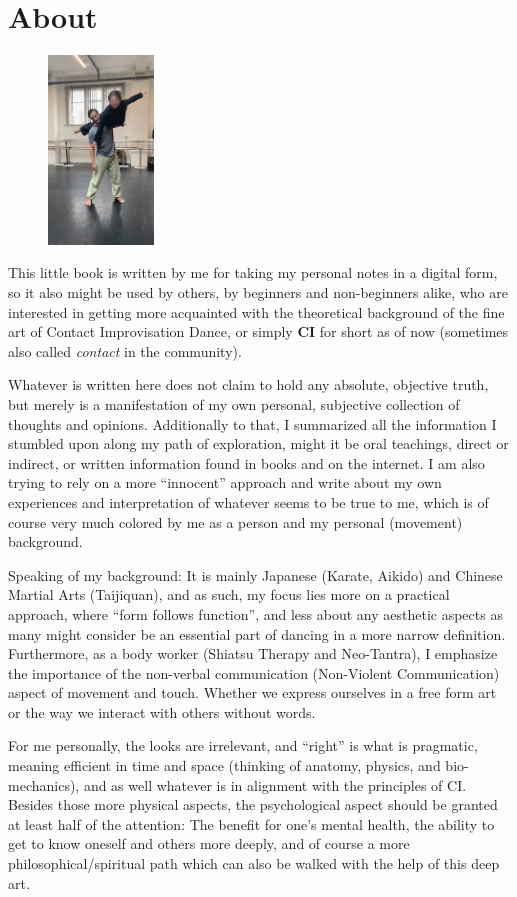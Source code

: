\section{About}\label{sec:about}

\begin{figure}
\centering
\includegraphics[width=0.25\textwidth]{images/about}
\end{figure}

This little book is written by me for taking my personal notes in a digital form, so it also might be used by others, by beginners and non-beginners alike, who are interested in getting more acquainted with the theoretical background of the fine art of Contact Improvisation Dance, or simply \textbf{CI} for short as of now (sometimes also called \textit{contact} in the community).

Whatever is written here does not claim to hold any absolute, objective truth, but merely is a manifestation of my own personal, subjective collection of thoughts and opinions.
Additionally to that, I summarized all the information I stumbled upon along my path of exploration, might it be oral teachings, direct or indirect, or written information found in books and on the internet.
I am also trying to rely on a more ``innocent'' approach and write about my own experiences and interpretation of whatever seems to be true to me, which is of course very much colored by me as a person and my personal (movement) background.

Speaking of my background: It is mainly Japanese (Karate, Aikido) and Chinese Martial Arts (Taijiquan), and as such, my focus lies more on a practical approach, where ``form follows function'', and less about any aesthetic aspects as many might consider be an essential part of dancing in a more narrow definition.
Furthermore, as a body worker (Shiatsu Therapy and Neo-Tantra), I emphasize the importance of the non-verbal communication (Non-Violent Communication) aspect of movement and touch.
Whether we express ourselves in a free form art or the way we interact with others without words.

For me personally, the looks are irrelevant, and ``right'' is what is pragmatic, meaning efficient in time and space (thinking of anatomy, physics, and bio-mechanics), and as well whatever is in alignment with the principles of CI. Besides those more physical aspects, the psychological aspect should be granted at least half of the attention: The benefit for one's mental health, the ability to get to know oneself and others more deeply, and of course a more philosophical/spiritual path which can also be walked with the help of this deep art.
